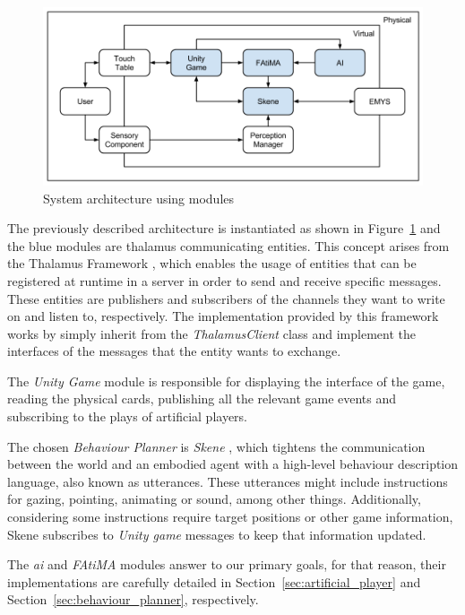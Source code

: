 \begin{figure}[ht]
  \centering
    \includegraphics[width=1\textwidth]{./img/model}
  \caption{System architecture using modules}
\label{fig:model}
\end{figure}

The previously described architecture is instantiated as shown in Figure~\ref{fig:model} and the blue modules are thalamus communicating entities.
This concept arises from the Thalamus Framework \cite{Ribeiro}, which enables the usage of entities that can be registered at runtime in a server in order to send and receive specific messages.
These entities are publishers and subscribers of the channels they want to write on and listen to, respectively.
The implementation provided by this framework works by simply inherit from the \emph{ThalamusClient} class and implement the interfaces of the messages that the entity wants to exchange.

The \emph{Unity Game} module is responsible for displaying the interface of the game, reading the physical cards, publishing all the relevant game events and subscribing to the plays of artificial players.

The chosen \emph{Behaviour Planner} is \emph{Skene} \cite{Ribeiroa}, which tightens the communication between the world and an embodied agent with a high-level behaviour description language, also known as utterances.
These utterances might include instructions for gazing, pointing, animating or sound, among other things.
Additionally, considering some instructions require target positions or other game information, Skene subscribes to \emph{Unity game} messages to keep that information updated.

The \emph{\ac{ai}} and \emph{FAtiMA} modules answer to our primary goals, for that reason, their implementations are carefully detailed in Section~\ref{sec:artificial_player} and Section~\ref{sec:behaviour_planner}, respectively.
